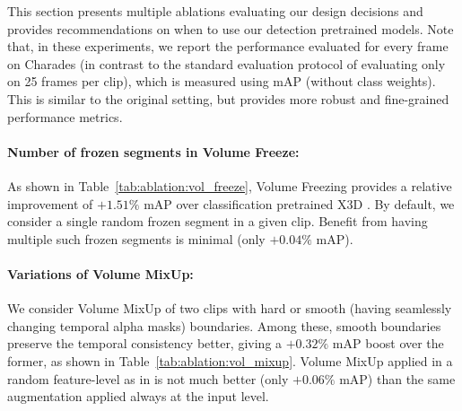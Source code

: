 \documentclass[letterpaper]{article} \usepackage{aaai23}  \usepackage{times}  \usepackage{helvet}  \usepackage{courier}  \usepackage[hyphens]{url}  \usepackage{graphicx} \urlstyle{rm} \def\UrlFont{\rm}  \usepackage{natbib}  \usepackage{caption} \frenchspacing  \setlength{\pdfpagewidth}{8.5in}  \setlength{\pdfpageheight}{11in}  \usepackage{algorithm}
\newcommand{\tref}[1]{Table~\ref{#1}}
\begin{document}
\begin{table*}[t!]
		
		\caption{\textbf{Derailed ablations on Charades} \cite{sigurdsson2016hollywood} \textbf{activity detection}, evaluating our design choices and showing when our detection pretrained models can be most beneficial (i.e., relative improvement from detection pretrained models are not as much as their counterparts at different temporal resolutions (\tref{tab:ablation:downsampling}) or strong temporal aggregation (\tref{tab:ablation:feat-agg})). Here, We show the performance in mean Average Precision (mAP) for fine-grained predictions (i.e., making decisions per every frame rather than evenly-sampled 25 frames from each validation clip). Relative changes of \textcolor{neg}{negative}, \textcolor{smpos}{postive-but-small} and \textcolor{pos}{postive} are shown in corresponding color, whereas the best performances that we highlight are \underline{underlined}. 
		}
		\label{tab:ablations}
\end{table*}
	
This section presents multiple ablations evaluating our design decisions and provides recommendations on when to use our detection pretrained models. Note that, in these experiments, we report the performance evaluated for every frame on Charades \cite{sigurdsson2016hollywood} (in contrast to the standard evaluation protocol of evaluating only on 25 frames per clip), which is measured using mAP (without class weights). This is similar to the original setting, but provides more robust and fine-grained performance metrics.

\paragraph{Number of frozen segments in Volume Freeze:} As shown in \tref{tab:ablation:vol_freeze}, Volume Freezing provides a relative improvement of $+1.51\%$ mAP over classification pretrained X3D \cite{feichtenhofer2020x3d}. By default, we consider a single random frozen segment in a given clip. Benefit from having multiple such frozen segments is minimal (only  $+0.04\%$ mAP).

\paragraph{Variations of Volume MixUp:} We consider Volume MixUp of two clips with hard or smooth (having seamlessly changing temporal alpha masks) boundaries. Among these, smooth boundaries preserve the temporal consistency better, giving a $+0.32\%$ mAP boost over the former, as shown in \tref{tab:ablation:vol_mixup}. Volume MixUp applied in a random feature-level as in \cite{verma2019manifold} is not much better (only  $+0.06\%$ mAP) than the same augmentation applied always at the input level.
\end{document}
